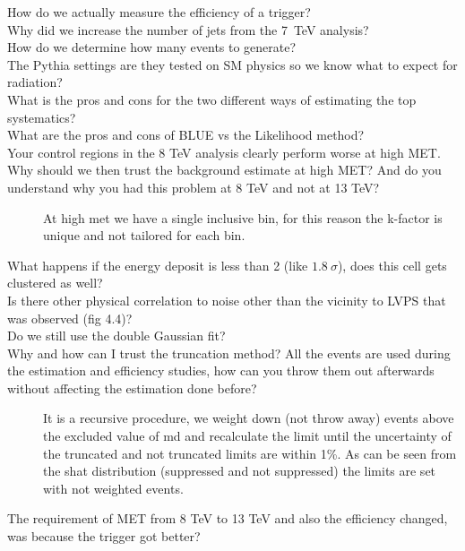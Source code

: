 \documentclass[a4paper,10pt,twoside,notitlepage]{article}
\begin{document}
\begin{description}
\item[How do we actually measure the efficiency of a trigger?]

\item[Why did we increase the number of jets from the 7~TeV analysis?]

\item[How do we determine how many events to generate?]

\item[The Pythia settings are they tested on SM physics so we know what to
  expect for radiation?]

\item[What is the pros and cons for the two different ways of estimating the top
  systematics?]

\item[What are the pros and cons of BLUE vs the Likelihood method?]

\item[Your control regions in the 8 TeV analysis clearly perform worse at high
  MET. Why should we then trust the background estimate at high MET? And do you
  understand why you had this problem at 8 TeV and not at 13 TeV?] At high met
  we have a single inclusive bin, for this reason the k-factor is unique and not
  tailored for each bin.


\item[What happens if the energy deposit is less than 2 (like $1.8~\sigma$),
  does this cell gets clustered as well?]

\item[Is there other physical correlation to noise other than the vicinity to
  LVPS that was observed (fig 4.4)?]

\item[Do we still use the double Gaussian fit?]

\item[Why and how can I trust the truncation method? All the events are used
  during the estimation and efficiency studies, how can you throw them out
  afterwards without affecting the estimation done before?] It is a recursive
  procedure, we weight down (not throw away) events above the excluded value of
  md and recalculate the limit until the uncertainty of the truncated and not
  truncated limits are within 1\%. As can be seen from the shat distribution
  (suppressed and not suppressed) the limits are set with not weighted events.

\item[The requirement of MET from 8 TeV to 13 TeV and also the efficiency
  changed, was because the trigger got better?]


\end{description}
\end{document}
